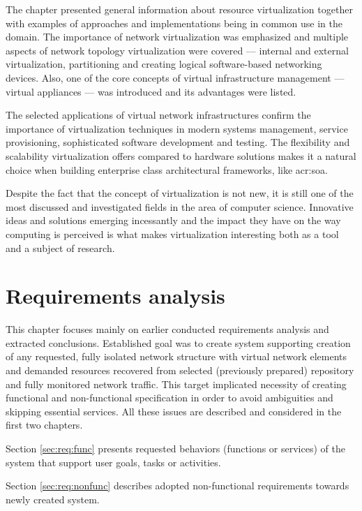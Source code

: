 \documentclass[11pt]{book}
\begin{document}
      The chapter presented general information about resource virtualization together with examples of approaches and
      implementations being in common use in the domain. The importance of network virtualization was emphasized and
      multiple aspects of network topology virtualization were covered --- internal and external virtualization,
      partitioning and creating logical software-based networking devices. Also, one of the core concepts of virtual
      infrastructure management --- virtual appliances --- was introduced and its advantages were listed.

      The selected applications of virtual network infrastructures confirm the importance of virtualization techniques
      in modern systems management, service provisioning, sophisticated software development and testing. The
      flexibility and scalability virtualization offers compared to hardware solutions makes it a natural choice when
      building enterprise class architectural frameworks, like \gls{acr:soa}.

      Despite the fact that the concept of virtualization is not new, it is still one of the most discussed and
      investigated fields in the area of computer science. Innovative ideas and solutions emerging incessantly and the
      impact they have on the way computing is perceived is what makes virtualization interesting both as a tool and
      a subject of research.


  \chapter{Requirements analysis}
  \label{chap:req}

    This chapter focuses mainly on earlier conducted requirements analysis and extracted conclusions. Established goal
    was to create system supporting creation of any requested, fully isolated network structure with virtual network
    elements and demanded resources recovered from selected (previously prepared) repository and fully monitored network
    traffic. This target implicated necessity of creating functional and non-functional specification in order to avoid
    ambiguities and skipping essential services. All these issues are described and considered in the first two
    chapters.

    Section \ref{sec:req:func} presents requested behaviors (functions or services) of the system that support user
    goals, tasks or activities.

    Section \ref{sec:req:nonfunc} describes adopted non-functional requirements towards newly created system.
\end{document}
